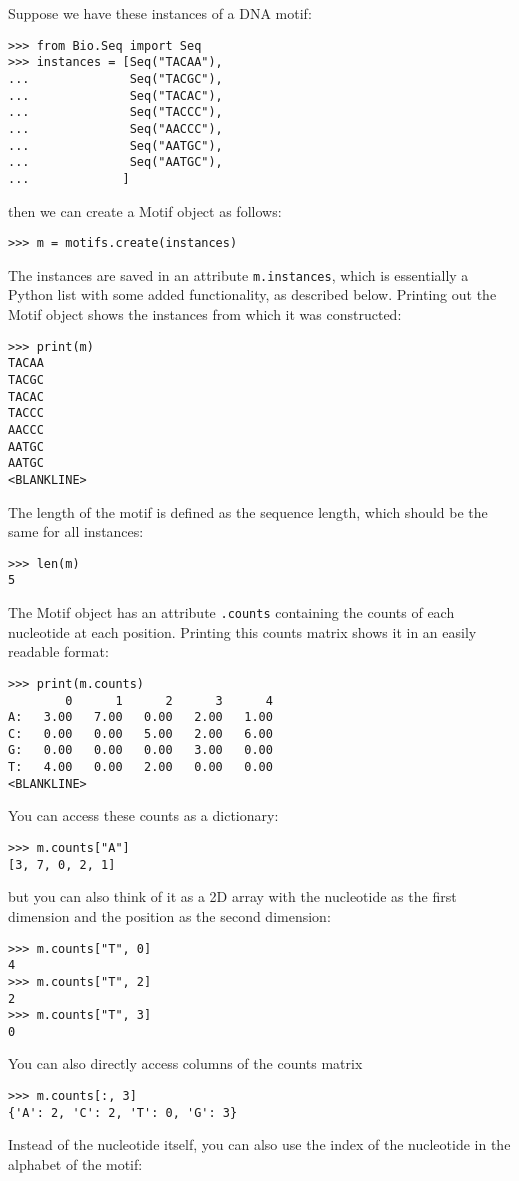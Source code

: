 Suppose we have these instances of a DNA motif:

\begin{verbatim}
>>> from Bio.Seq import Seq
>>> instances = [Seq("TACAA"),
...              Seq("TACGC"),
...              Seq("TACAC"),
...              Seq("TACCC"),
...              Seq("AACCC"),
...              Seq("AATGC"),
...              Seq("AATGC"),
...             ]
\end{verbatim}
then we can create a Motif object as follows:

\begin{verbatim}
>>> m = motifs.create(instances)
\end{verbatim}
The instances are saved in an attribute \verb+m.instances+, which is essentially a Python list with some added functionality, as described below.
Printing out the Motif object shows the instances from which it was constructed:

\begin{verbatim}
>>> print(m)
TACAA
TACGC
TACAC
TACCC
AACCC
AATGC
AATGC
<BLANKLINE>
\end{verbatim}
The length of the motif is defined as the sequence length, which should be the same for all instances:

\begin{verbatim}
>>> len(m)
5
\end{verbatim}
The Motif object has an attribute \verb+.counts+ containing the counts of each
nucleotide at each position. Printing this counts matrix shows it in an easily readable format:

\begin{verbatim}
>>> print(m.counts)
        0      1      2      3      4
A:   3.00   7.00   0.00   2.00   1.00
C:   0.00   0.00   5.00   2.00   6.00
G:   0.00   0.00   0.00   3.00   0.00
T:   4.00   0.00   2.00   0.00   0.00
<BLANKLINE>
\end{verbatim}

You can access these counts as a dictionary:

\begin{verbatim}
>>> m.counts["A"]
[3, 7, 0, 2, 1]
\end{verbatim}
but you can also think of it as a 2D array with the nucleotide as the first
dimension and the position as the second dimension:

\begin{verbatim}
>>> m.counts["T", 0]
4
>>> m.counts["T", 2]
2
>>> m.counts["T", 3]
0
\end{verbatim}
You can also directly access columns of the counts matrix
\begin{verbatim}
>>> m.counts[:, 3]
{'A': 2, 'C': 2, 'T': 0, 'G': 3}
\end{verbatim}
Instead of the nucleotide itself, you can also use the index of the nucleotide
in the alphabet of the motif:

